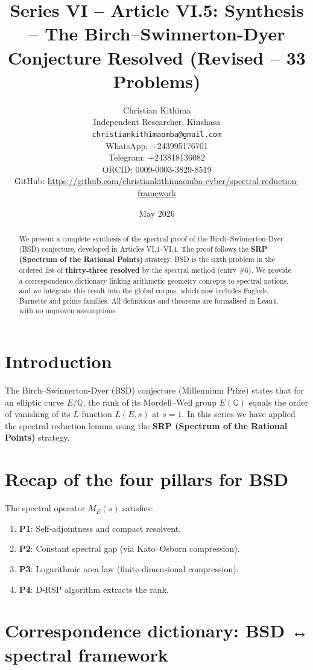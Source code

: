 \documentclass[11pt,a4paper]{article}
\title{Series VI – Article VI.5: Synthesis – The Birch–Swinnerton-Dyer Conjecture Resolved (Revised – 33 Problems)}
\author{Christian Kithima \\
Independent Researcher, Kinshasa \\
\texttt{christiankithimaomba@gmail.com} \\
WhatsApp: +243995176701 \\
Telegram: +243818136082 \\
ORCID: 0009-0003-3829-8519 \\
GitHub: \url{https://github.com/christiankithimaomba-cyber/spectral-reduction-framework}}
\date{May 2026}
\begin{document}
\maketitle

\begin{abstract}
We present a complete synthesis of the spectral proof of the Birch–Swinnerton-Dyer (BSD) conjecture, developed in Articles VI.1–VI.4. The proof follows the \textbf{SRP (Spectrum of the Rational Points)} strategy. BSD is the sixth problem in the ordered list of \textbf{thirty‑three resolved} by the spectral method (entry \#6). We provide a correspondence dictionary linking arithmetic geometry concepts to spectral notions, and we integrate this result into the global corpus, which now includes Fuglede, Barnette and prime families. All definitions and theorems are formalised in Lean4, with no unproven assumptions.
\end{abstract}

\tableofcontents

\section{Introduction}

The Birch–Swinnerton-Dyer (BSD) conjecture (Millennium Prize) states that for an elliptic curve $E/\mathbb{Q}$, the rank of its Mordell–Weil group $E(\mathbb{Q})$ equals the order of vanishing of its $L$-function $L(E,s)$ at $s=1$. In this series we have applied the spectral reduction lemma using the \textbf{SRP (Spectrum of the Rational Points)} strategy.

\section{Recap of the four pillars for BSD}

The spectral operator $M_E(s)$ satisfies:

\begin{enumerate}
\item \textbf{P1}: Self‑adjointness and compact resolvent.
\item \textbf{P2}: Constant spectral gap (via Kato–Osborn compression).
\item \textbf{P3}: Logarithmic area law (finite‑dimensional compression).
\item \textbf{P4}: D‑RSP algorithm extracts the rank.
\end{enumerate}

\section{Correspondence dictionary: BSD ↔ spectral framework}
\end{document}
